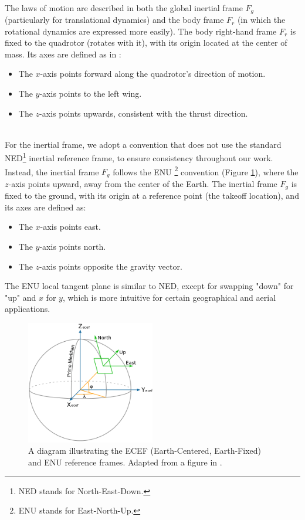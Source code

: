 \documentclass[main]{subfiles}
\begin{document}
\noindent\\
The laws of motion are described in both the global inertial frame \( F_g \) 
(particularly for translational dynamics) and the body frame 
\( F_r \) (in which the rotational dynamics are expressed more 
easily). The body right-hand frame \( F_r \) is fixed to the quadrotor 
(rotates with it), with its 
origin located at the center of mass.
Its axes are defined as in \cite{model_quadrotor}:
\noindent
\begin{itemize}
    \item The \( x \)-axis points forward along the quadrotor's direction 
 of motion.
    \item The \( y \)-axis points to the left wing.
    \item The \( z \)-axis points upwards, consistent with 
 the thrust direction.
\end{itemize}

\noindent\\
For the inertial frame, we adopt a convention that does not use 
the standard NED\footnote{NED stands for North-East-Down.} inertial 
reference frame, to ensure consistency throughout our work. 
Instead, the inertial frame \( F_g \) follows the ENU 
\footnote{ENU stands for East-North-Up.} 
convention (Figure \ref{fig:ENU}), where the 
\( z \)-axis points upward, away from the center of the Earth. The 
inertial frame \( F_g \) is fixed to the ground, with its origin at a 
reference point (the takeoff location), and its axes are defined as:
\begin{itemize}
    \item The \( x \)-axis points east.
    \item The \( y \)-axis points north.
    \item The \( z \)-axis points opposite the gravity vector.
\end{itemize}
The ENU local tangent plane is similar to NED, except for swapping 
"down" for "up" and \( x \) for \( y \), which is more intuitive for certain 
geographical and aerial applications.

\begin{figure}
    \centering
    \includegraphics[width=0.5\textwidth]{images/ECEF_ENU_Longitude_Latitude_relationships.png}
    \caption[ENU and ECEF Reference Frames]{A diagram illustrating the ECEF (Earth-Centered, Earth-Fixed) 
 and ENU reference frames. 
 Adapted from a figure in \cite{ENU}.}
    \label{fig:ENU}
\end{figure}
\end{document}
